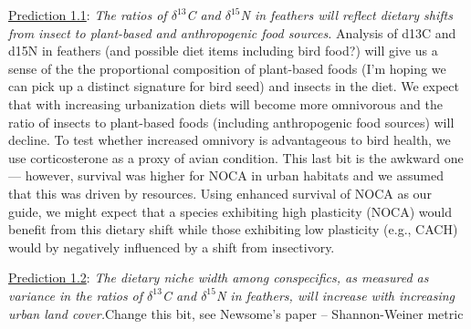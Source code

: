 \documentclass[12pt]{article}
\begin{document}

\noindent \underline{Prediction 1.1}: \textit{The ratios of $\delta^{13}$C and $\delta^{15}$N in feathers will reflect dietary shifts from insect to plant-based and anthropogenic food sources.}  Analysis of d13C and d15N in feathers (and possible diet items including bird food?) will give us a sense of the the proportional composition of plant-based foods (I’m hoping we can pick up a distinct signature for bird seed) and insects in the diet. We expect that with increasing urbanization diets will become more omnivorous and the ratio of insects to plant-based foods (including anthropogenic food sources) will decline. To test whether increased omnivory is advantageous to bird health, we use corticosterone as a proxy of avian condition. This last bit is the awkward one — however, survival was higher for NOCA in urban habitats and we assumed that this was driven by resources. Using enhanced survival of NOCA as our guide, we might expect that a species exhibiting high plasticity (NOCA) would benefit from this dietary shift while those exhibiting low plasticity (e.g., CACH) would by negatively influenced by a shift from insectivory.\par


\noindent \underline{Prediction 1.2}: \textit{ The dietary niche width among conspecifics, as measured as variance in the ratios of $\delta^{13}$C and $\delta^{15}$N in feathers,  will increase with increasing urban land cover.}Change this bit, see Newsome's paper -- Shannon-Weiner metric \par

\end{document}
